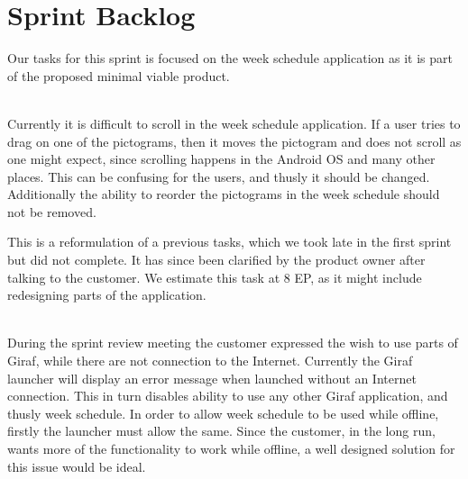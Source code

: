 \section{Sprint Backlog}\label{plan2}
Our tasks for this sprint is focused on the week schedule application as it is part of the proposed minimal viable product. 
\begin{description}[style=unboxed]
    \item[{[}\phigh{]} Week Schedule -- Long Schedules] \hfill \\ 
    Currently it is difficult to scroll in the week schedule application.
    If a user tries to drag on one of the pictograms, then it moves the pictogram and does not scroll as one might expect, since scrolling happens in the Android OS and many other places. 
    This can be confusing for the users, and thusly it should be changed. 
    Additionally the ability to reorder the pictograms in the week schedule should not be removed. 

    This is a reformulation of a previous tasks, which we took late in the first sprint but did not complete. 
    It has since been clarified by the product owner after talking to the customer. 
    We estimate this task at 8 EP, as it might include redesigning parts of the application. 
    \item[{[}\phigh{]} Week Schedule -- Offline Usage] \hfill \\ 
    During the sprint review meeting the customer expressed the wish to use parts of Giraf, while there are not connection to the Internet. 
    Currently the Giraf launcher will display an error message when launched without an Internet connection. 
    This in turn disables ability to use any other Giraf application, and thusly week schedule. 
    In order to allow week schedule to be used while offline, firstly the launcher must allow the same. 
    Since the customer, in the long run, wants more of the functionality to work while offline, a well designed solution for this issue would be ideal. 


\end{description}

